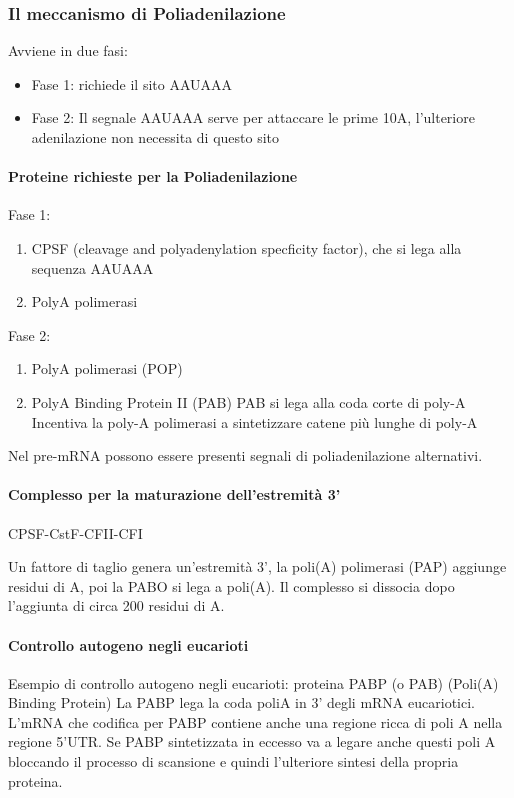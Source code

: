 \documentclass{article}
\begin{document}
\subsubsection{Il meccanismo di Poliadenilazione}
Avviene in due fasi:
\begin{itemize}
    \item Fase 1: richiede il sito AAUAAA
    \item Fase 2: Il segnale AAUAAA serve per attaccare le prime 10A, l'ulteriore adenilazione non necessita di questo sito
\end{itemize}
\paragraph{Proteine richieste per la Poliadenilazione}
Fase 1:
\begin{enumerate}
    \item CPSF (cleavage and polyadenylation specficity factor), che si lega alla sequenza AAUAAA
    \item PolyA polimerasi
\end{enumerate}
Fase 2:
\begin{enumerate}
    \item PolyA polimerasi (POP)
    \item PolyA Binding Protein II (PAB)
    \subitem PAB si lega alla coda corte di poly-A
    \subitem Incentiva la poly-A polimerasi a sintetizzare catene più lunghe di poly-A
\end{enumerate}
Nel pre-mRNA possono essere presenti segnali di poliadenilazione alternativi.
\paragraph{Complesso per la maturazione dell'estremità 3'}
\begin{center}
CPSF-CstF-CFII-CFI
\end{center}
Un fattore di taglio genera un'estremità 3', la poli(A) polimerasi (PAP) aggiunge residui di A, poi la PABO si lega a poli(A). Il complesso si dissocia dopo l'aggiunta di circa 200 residui di A.
\paragraph{Controllo autogeno negli eucarioti}
Esempio di controllo autogeno negli eucarioti: proteina PABP (o
PAB) (Poli(A) Binding Protein)
La PABP lega la coda poliA in 3' degli mRNA eucariotici. L'mRNA
che codifica per PABP contiene anche una regione ricca di poli A
nella regione 5'UTR.
Se PABP sintetizzata in eccesso va a legare anche questi poli A
bloccando il processo di scansione e quindi l'ulteriore sintesi
della propria proteina.
\end{document}
